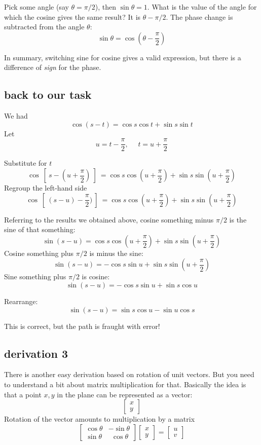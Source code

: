 \documentclass[11pt, oneside]{article}
\begin{document}
Pick some angle (say $\theta = \pi/2$), then $\sin \theta = 1$.  What is the value of the angle for which the cosine gives the same result?  It is $\theta - \pi/2$.  The phase change is subtracted from the angle $\theta$:
\[ \sin \theta = \cos (\theta - \frac{\pi}{2}) \]

In summary, switching sine for cosine gives a valid expression, but there is a difference of \emph{sign} for the phase.

\subsection*{back to our task}

We had
\[ \cos (s - t) = \cos s \cos t + \sin s \sin t \]
Let
\[ u = t - \frac{\pi}{2}, \ \ \ \ \ \  t  = u + \frac{\pi}{2} \]

Substitute for $t$
\[ \cos \ [ \ s - (u + \frac{\pi}{2}) \ ] \ = \cos s \cos (u + \frac{\pi}{2}) + \sin s \sin (u + \frac{\pi}{2}) \]
Regroup the left-hand side
\[ \cos \ [ \ (s - u) - \frac{\pi}{2}) \ ] \ = \cos s \cos (u + \frac{\pi}{2}) + \sin s \sin (u + \frac{\pi}{2}) \]

Referring to the results we obtained above, cosine something minus $\pi/2$ is the sine of that something:
\[ \sin (s - u) = \cos s \cos (u + \frac{\pi}{2}) + \sin s \sin (u + \frac{\pi}{2}) \]
Cosine something plus $\pi/2$ is minus the sine:
\[ \sin (s - u) = -\cos s \sin u + \sin s \sin (u + \frac{\pi}{2}) \]
Sine something plus $\pi/2$ is cosine:
\[ \sin (s - u) = -\cos s \sin u + \sin s \cos u \]

Rearrange:
\[ \sin (s - u) = \sin s \cos u - \sin u \cos s \]

This is correct, but the path is fraught with error!  

\subsection*{derivation 3}
There is another easy derivation based on rotation of unit vectors.  But you need to understand a bit about matrix multiplication for that.  Basically the idea is that a point $x,y$ in the plane can be represented as a vector:
\[ 
\begin{bmatrix}
x \\
y
\end{bmatrix}
\]
Rotation of the vector amounts to multiplication by a matrix
\[
\begin{bmatrix}  
\cos \theta & -\sin \theta \\
\sin \theta & \ \  \cos \theta 
\end{bmatrix}
\begin{bmatrix}  x \\ y \end{bmatrix}
=
\begin{bmatrix}  u \\ v \end{bmatrix}
\]
\end{document}
